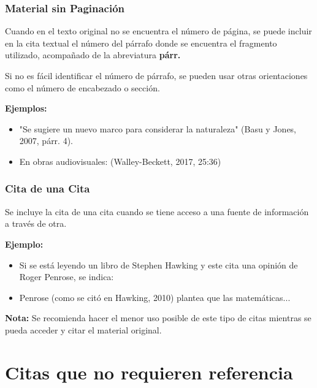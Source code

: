 \documentclass[aspectratio=169]{beamer}
\begin{document}
\begin{frame}
	\frametitle{Material sin Paginación}
	Cuando en el texto original no se encuentra el número de página, se puede incluir en la cita textual el número del párrafo donde se encuentra el fragmento utilizado, acompañado de la abreviatura \textbf{párr.}
	
	\vspace{1em}
	
	Si no es fácil identificar el número de párrafo, se pueden usar otras orientaciones como el número de encabezado o sección.
	
	\vspace{1em}
	
	\textbf{Ejemplos:}
	\begin{itemize}
		\item "Se sugiere un nuevo marco para considerar la naturaleza" (Basu y Jones, 2007, párr. 4).
		\item En obras audiovisuales: (Walley-Beckett, 2017, 25:36)
	\end{itemize}
\end{frame}

\begin{frame}
	\frametitle{Cita de una Cita}
	Se incluye la cita de una cita cuando se tiene acceso a una fuente de información a través de otra.
	
	\vspace{1em}
	
	\textbf{Ejemplo:}
	\begin{itemize}
		\item Si se está leyendo un libro de Stephen Hawking y este cita una opinión de Roger Penrose, se indica:
		\item Penrose (como se citó en Hawking, 2010) plantea que las matemáticas...
	\end{itemize}
	
	\vspace{1em}
	
	\textbf{Nota:} Se recomienda hacer el menor uso posible de este tipo de citas mientras se pueda acceder y citar el material original.
\end{frame}

\section{Citas que no requieren referencia}
\end{document}
